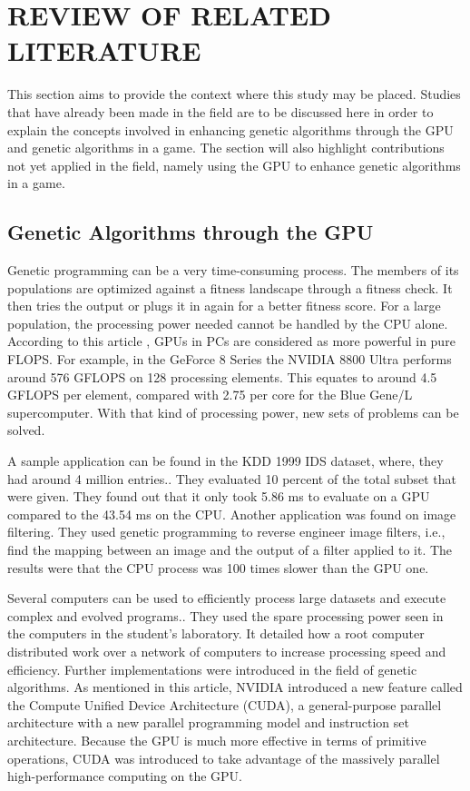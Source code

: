 \chapter{REVIEW OF RELATED LITERATURE}

This section aims to provide the context where this study may be placed. 
Studies that have already been made in the field are to be discussed here in order to 
explain the concepts involved in enhancing genetic algorithms through the GPU and 
genetic algorithms in a game. The section will also highlight contributions not yet 
applied in the field, namely using the GPU to enhance genetic algorithms in a game.


\section{Genetic Algorithms through the GPU}

Genetic programming can be a very time-consuming process.  The members of its
populations are optimized against a fitness landscape through a fitness check. It
then tries the output or plugs it in again for a better fitness score. For a large
population, the processing power needed cannot be handled by the CPU alone. According
to this article , GPUs in PCs are considered as more powerful in pure FLOPS\cite{Banzhaf09}.
For example, in the GeForce 8 Series the NVIDIA 8800 Ultra performs around 576 GFLOPS
on 128 processing elements. This equates to around 4.5 GFLOPS per element, compared
with 2.75 per core for the Blue Gene/L supercomputer.  With that kind of processing power, 
new sets of problems can be solved.  

A sample application can be found in the KDD 1999 IDS dataset, where, they had around
4 million entries.\cite{Banzhaf09}. They evaluated 10 percent of the total subset that
were given. They found out that it only took 5.86 ms to evaluate on a GPU compared to
the 43.54 ms on the CPU. Another application was found on image filtering. They used
genetic programming to reverse engineer image filters, i.e., find the mapping between
an image and the output of a filter applied to it.  The results were that the CPU process 
was 100 times slower than the GPU one.  

Several computers can be used to efficiently process large datasets and execute complex
and evolved programs.\cite{Harding09}. They used the spare processing power seen in the
computers in the student's laboratory. It detailed how a root computer distributed work
over a network of computers to increase processing speed and efficiency. Further
implementations were introduced in the field of genetic algorithms. As mentioned in this
article, NVIDIA introduced a new feature called the Compute Unified Device Architecture (CUDA),
a general-purpose parallel architecture with a new parallel programming model and instruction
set architecture\cite{Zhang09}.  Because the GPU is much more effective in terms of primitive
operations, CUDA was introduced to take advantage of the massively parallel high-performance
computing on the GPU.  

